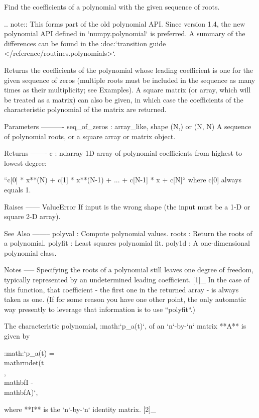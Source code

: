 \begin{DoxyVerb}Find the coefficients of a polynomial with the given sequence of roots.

.. note::
   This forms part of the old polynomial API. Since version 1.4, the
   new polynomial API defined in `numpy.polynomial` is preferred.
   A summary of the differences can be found in the
   :doc:`transition guide </reference/routines.polynomials>`.

Returns the coefficients of the polynomial whose leading coefficient
is one for the given sequence of zeros (multiple roots must be included
in the sequence as many times as their multiplicity; see Examples).
A square matrix (or array, which will be treated as a matrix) can also
be given, in which case the coefficients of the characteristic polynomial
of the matrix are returned.

Parameters
----------
seq_of_zeros : array_like, shape (N,) or (N, N)
    A sequence of polynomial roots, or a square array or matrix object.

Returns
-------
c : ndarray
    1D array of polynomial coefficients from highest to lowest degree:

    ``c[0] * x**(N) + c[1] * x**(N-1) + ... + c[N-1] * x + c[N]``
    where c[0] always equals 1.

Raises
------
ValueError
    If input is the wrong shape (the input must be a 1-D or square
    2-D array).

See Also
--------
polyval : Compute polynomial values.
roots : Return the roots of a polynomial.
polyfit : Least squares polynomial fit.
poly1d : A one-dimensional polynomial class.

Notes
-----
Specifying the roots of a polynomial still leaves one degree of
freedom, typically represented by an undetermined leading
coefficient. [1]_ In the case of this function, that coefficient -
the first one in the returned array - is always taken as one. (If
for some reason you have one other point, the only automatic way
presently to leverage that information is to use ``polyfit``.)

The characteristic polynomial, :math:`p_a(t)`, of an `n`-by-`n`
matrix **A** is given by

    :math:`p_a(t) = \\mathrm{det}(t\\, \\mathbf{I} - \\mathbf{A})`,

where **I** is the `n`-by-`n` identity matrix. [2]_


\end{DoxyVerb}
